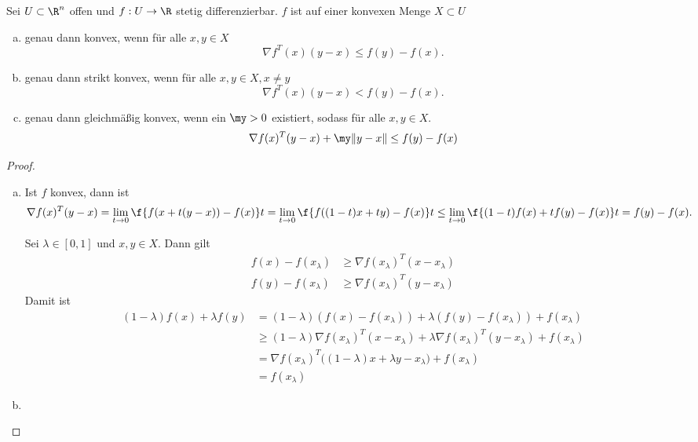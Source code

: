 \begin{st} \label{2.16}
	Sei $U \subset \R^n$ offen und $f: U \to \R$ stetig differenzierbar.
	$f$ ist auf einer konvexen Menge $X \subset U$
	\begin{enumerate}[(a)]
		\item
			genau dann konvex, wenn für alle $x,y \in X$
			\[
				\nabla f^T(x) (y-x)
				\le f(y) - f(x).
			\]
		\item
			genau dann strikt konvex, wenn für alle $x,y \in X, x \neq y$
			\[
				\nabla f^T(x) (y-x)
				< f(y) - f(x).
			\]
		\item
			genau dann gleichmäßig konvex, wenn ein $\my > 0$ existiert, sodass für alle $x,y \in X$.
			\[
				\nabla f(x)^T (y-x) + \my \|y-x\|
				\le f(y) - f(x)
			\]
	\end{enumerate}
	\begin{proof}
		\begin{enumerate}[(a)]
			\item
				\begin{seg}[„$\implies$“]
					Ist $f$ konvex, dann ist
					\[
						\nabla f(x)^T (y-x)
						= \lim_{t \to 0} \f {f(x+t(y-x)) - f(x)}t
						= \lim_{t \to 0} \f {f((1-t)x + ty) - f(x)}t
						\le \lim_{t \to 0} \f{(1-t)f(x) + tf(y) - f(x)}t
						= f(y) - f(x).
					\]
				\end{seg}
				\begin{seg}[„$\impliedby$“]
					Sei $\lambda \in [0,1]$ und $x,y \in X$.
					Dann gilt
					\begin{align*}
						f(x) - f(x_\lambda)
						&\ge \nabla f(x_\lambda)^T(x-x_\lambda) \\
						f(y) - f(x_\lambda)
						&\ge \nabla f(x_\lambda)^T(y-x_\lambda)
					\end{align*}
					Damit ist
					\begin{align*}
						(1-\lambda) f(x) + \lambda f(y)
						&= (1-\lambda)(f(x) - f(x_\lambda)) + \lambda (f(y) - f(x_\lambda)) + f(x_\lambda) \\
						&\ge (1-\lambda) \nabla f(x_\lambda)^T (x-x_\lambda) + \lambda \nabla f(x_\lambda)^T (y-x_\lambda) + f(x_\lambda) \\
						&= \nabla f(x_\lambda)^T \big( (1-\lambda) x + \lambda y - x_\lambda \big) + f(x_\lambda) \\
						&= f(x_\lambda)
					\end{align*}
				\end{seg}
			\item
				\begin{seg}[„$\implies$“]

\end{seg}
\end{enumerate}
\end{proof}
\end{st}
